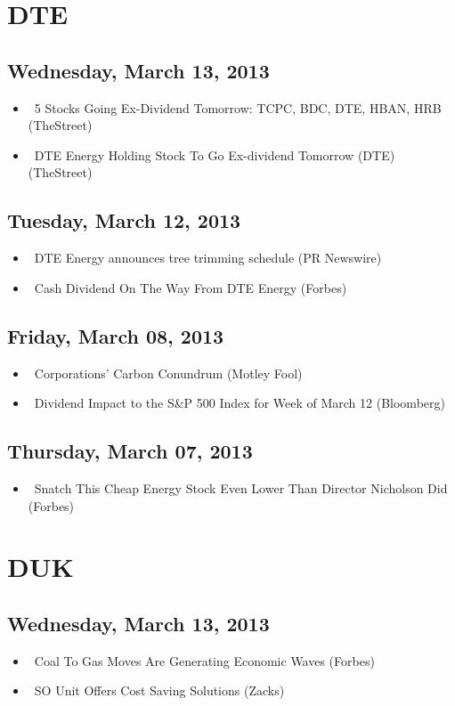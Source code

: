 \documentclass[11pt,asymmetric]{article}
\begin{document}
\section*{DTE}

\subsection*{Wednesday, March 13, 2013}
\begin{itemize}
\item\ 5 Stocks Going Ex-Dividend Tomorrow: TCPC, BDC, DTE, HBAN, HRB (TheStreet)
\item\ DTE Energy Holding Stock To Go Ex-dividend Tomorrow (DTE) (TheStreet)
\end{itemize}
\subsection*{Tuesday, March 12, 2013}
\begin{itemize}
\item\ DTE Energy announces tree trimming schedule (PR Newswire)
\item\ Cash Dividend On The Way From DTE Energy (Forbes)
\end{itemize}
\subsection*{Friday, March 08, 2013}
\begin{itemize}
\item\ Corporations' Carbon Conundrum (Motley Fool)
\item\ Dividend Impact to the S\&P 500 Index for Week of March 12 (Bloomberg)
\end{itemize}
\subsection*{Thursday, March 07, 2013}
\begin{itemize}
\item\ Snatch This Cheap Energy Stock Even Lower Than Director Nicholson Did (Forbes)
\end{itemize}

\section*{DUK}

\subsection*{Wednesday, March 13, 2013}
\begin{itemize}
\item\ Coal To Gas Moves Are Generating Economic Waves (Forbes)
\item\ SO Unit Offers Cost Saving Solutions (Zacks)
\end{itemize}
\end{document}
